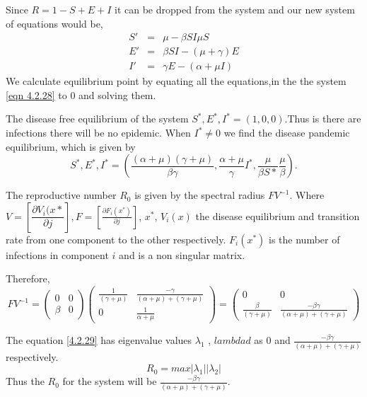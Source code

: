 Since $R = 1- S + E + I$ it can be dropped from the system and our new system of equations would be, 
\begin{equation} \label{eqn 4.2.28}
\begin{array}{ccc}
S'&=& \mu -\beta S I  \mu S \\
E' &=& \beta S I - (\mu + \gamma) E  \\
I' &=& \gamma E - (\alpha + \mu I)
 \end{array} 
\end{equation}
We calculate equilibrium point by equating all the equations,in the the system  \ref{eqn 4.2.28} to 0 and solving them. 

The disease free equilibrium of the system $S^*, E^*, I^* = (1,0,0)$.Thus is there are infections there will be no epidemic. When $I^* \neq 0$ we find the disease pandemic equilibrium, which is given by
\begin{equation*}
S^*, E^*, I^*  = \left(\frac{(\alpha + \mu)(\gamma + \mu)}{\beta \gamma} , \frac{\alpha + \mu }{ \gamma} I^*, \frac{\mu}{\beta S*} \frac{\mu}{\beta} \right).
\end{equation*}

The reproductive number $R_0$ is given by the spectral radius $FV^{-1}$.  Where  
$ V = \left[\dfrac{\partial V_i(x*}{\partial j} \right],  F = \left[ \frac{\partial F_i (x^*)}{\partial j}\right]$,  $x^*$, $V_i (x)$  the disease equilibrium and transition rate from one component to the other respectively. $F_i(x^*)$ is the  number of infections in component $i$ and is a non singular matrix.

Therefore,
\begin{equation}\label{4.2.29}
FV^{-1} = \left(\begin{array}{cc} 
0&0 \\ \beta&0
\end{array} \right) \left(\begin{array}{cc}
\frac{1}{(\gamma + \mu)}&  \frac{-\gamma}{(\alpha +\mu)+ (\gamma + \mu)}\\ 0& \frac{1}{\alpha + \mu}  

\end{array} \right) = \left(\begin{array}{cc} 0&0 \\
\frac{\beta}{(\gamma + \mu)} &\frac{- \beta\gamma}{(\alpha +\mu)+ (\gamma + \mu)} 
\end{array}\right)
\end{equation}

The equation \ref{4.2.29} has eigenvalue values $\lambda_1$ , $lambdad$ as 0 and $\frac{- \beta\gamma}{(\alpha +\mu)+ (\gamma + \mu)}$ respectively.
 \begin{equation}
 R_0 = max {|\lambda_1| |\lambda_2|}
 \end{equation}
Thus the $R_0$ for the system will be $\frac{- \beta\gamma}{(\alpha +\mu)+ (\gamma + \mu)}$.

